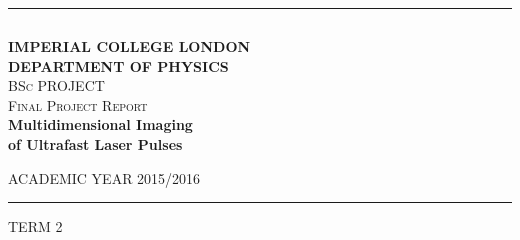 \begin{titlepage}
\begin{center}


\hrule
$$$$
$$$$

\textsc{\LARGE \textbf{IMPERIAL COLLEGE LONDON}}\\[0.5cm]
\textsc{\LARGE \textbf{DEPARTMENT OF PHYSICS}}\\[1.3cm]
\textsc{\Large BSc PROJECT}\\[0.5cm]
\textsc{\Large Final Project Report}\\[1.3cm]

\vfill
\vfill
{ \huge \bfseries Multidimensional Imaging}\\
\vfill
{ \huge \bfseries of Ultrafast Laser Pulses}\\
\vfill
\vfill
\vfill

\begin{parcolumns}{2}
\end{parcolumns}
\vfill
\vfill
\vfill
\vfill
\vfill
\vfill
\vfill
\vfill
\vfill

\large ACADEMIC YEAR 2015/2016
\hrule
\vfill
\large TERM 2
\vfill
\vfill

\end{center}
\end{titlepage}